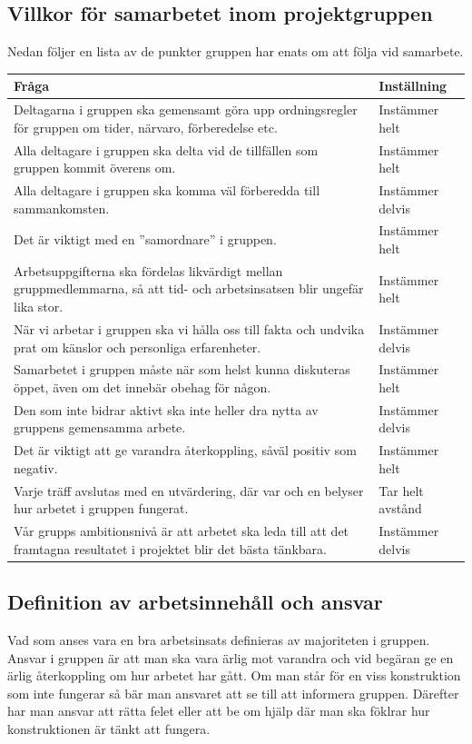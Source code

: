 \documentclass[projektplan/plan.tex]{subfiles}
\begin{document}
\subsection{Villkor för samarbetet inom projektgruppen}
\label{sec:doc}
Nedan följer en lista av de punkter gruppen har enats om att följa vid samarbete.
{\renewcommand{\arraystretch}{1.6}
\begin{longtable}{p{}p{}}
    \bfseries Fråga &
    \bfseries Inställning \\\hline
    Deltagarna i gruppen ska gemensamt göra upp ordningsregler för gruppen om
    tider, närvaro, förberedelse etc. &
    Instämmer helt
    \\
    Alla deltagare i gruppen ska delta vid de tillfällen som gruppen kommit
    överens om. &
    Instämmer helt
    \\
    Alla deltagare i gruppen ska komma väl förberedda till sammankomsten. &
    Instämmer delvis
    \\
    Det är viktigt med en ”samordnare” i gruppen. &
    Instämmer helt
    \\
    Arbetsuppgifterna ska fördelas likvärdigt mellan gruppmedlemmarna, så att
    tid- och arbetsinsatsen blir ungefär lika stor. &
    Instämmer helt
    \\
    När vi arbetar i gruppen ska vi hålla oss till fakta och undvika prat om
    känslor och personliga erfarenheter. &
    Instämmer delvis
    \\
    Samarbetet i gruppen måste när som helst kunna diskuteras öppet, även om
    det innebär obehag för någon. &
    Instämmer helt
    \\
    Den som inte bidrar aktivt ska inte heller dra nytta av gruppens gemensamma
    arbete. &
    Instämmer delvis
    \\
    Det är viktigt att ge varandra återkoppling, såväl positiv som negativ. &
    Instämmer helt
    \\
    Varje träff avslutas med en utvärdering, där var och en belyser hur arbetet
    i gruppen fungerat. &
    Tar helt avstånd
    \\
    Vår grupps ambitionsnivå är att arbetet ska leda till att det framtagna
    resultatet i projektet blir det bästa tänkbara. &
    Instämmer delvis
    \\
    
    \endhead
\end{longtable}}

\noindent
\newpage
\subsection{Definition av arbetsinnehåll och ansvar}
Vad som anses vara en bra arbetsinsats definieras av majoriteten i gruppen.
Ansvar i gruppen är att man ska vara ärlig mot varandra och vid begäran ge en 
ärlig återkoppling om hur arbetet har gått. Om man står för en viss
konstruktion som inte fungerar så bär man ansvaret att se till att informera
gruppen. Därefter har man ansvar att rätta felet eller att be om hjälp där
man ska föklrar hur konstruktionen är tänkt att fungera.
\end{document}
